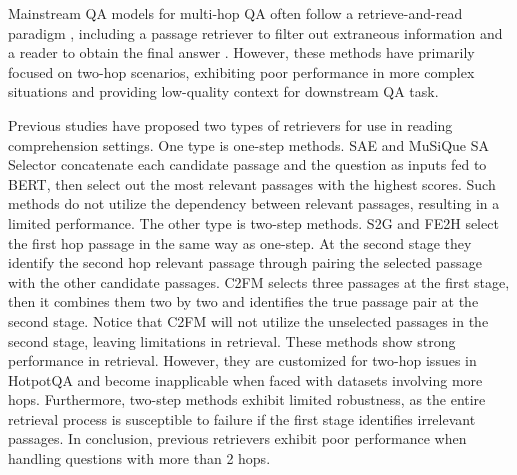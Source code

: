 \documentclass[10.5pt]{article}
\begin{document}
Mainstream QA models for multi-hop QA often follow a retrieve-and-read paradigm \cite{retrieving_and_reading}, including a passage retriever to filter out extraneous information and a reader to obtain the final answer \cite{DBLP:conf/aaai/TuHW0HZ20, DBLP:journals/corr/abs-2107-11823, musique, DBLP:journals/corr/abs-2205-11729, DBLP:journals/corr/abs-2212-09512}. However, these methods have primarily focused on two-hop scenarios, exhibiting poor performance in more complex situations and providing low-quality context for downstream QA task.


Previous studies have proposed two types of retrievers for use in reading comprehension settings. One type is one-step methods. SAE \cite{DBLP:conf/aaai/TuHW0HZ20} and MuSiQue SA Selector \cite{musique} concatenate each candidate passage and the question as inputs fed to BERT, then select out the most relevant passages with the highest scores. Such methods do not utilize the dependency between relevant passages, resulting in a limited performance. The other type is two-step methods. S2G \cite{DBLP:journals/corr/abs-2107-11823} and FE2H \cite{DBLP:journals/corr/abs-2205-11729} select the first hop passage in the same way as one-step. At the second stage they identify the second hop relevant passage through pairing the selected passage with the other candidate passages. C2FM \cite{DBLP:journals/corr/abs-2212-09512} selects three passages at the first stage, then it combines them two by two and identifies the true passage pair at the second stage. Notice that C2FM will not utilize the unselected passages in the second stage, leaving limitations in retrieval. These methods show strong performance in retrieval. However, they are customized for two-hop issues in HotpotQA and become inapplicable when faced with datasets involving more hops. Furthermore, two-step methods exhibit limited robustness, as the entire retrieval process is susceptible to failure if the first stage identifies irrelevant passages. 
In conclusion, previous retrievers exhibit poor performance when handling questions with more than 2 hops. 
\end{document}
